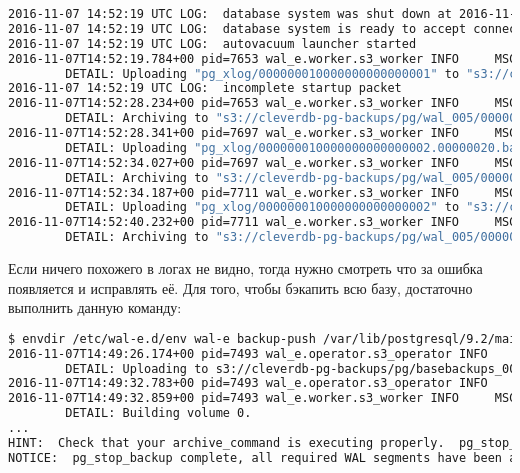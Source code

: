 \begin{lstlisting}[language=Bash,label=lst:wal-e8,caption=Логи PostgreSQL]
2016-11-07 14:52:19 UTC LOG:  database system was shut down at 2016-11-07 14:51:40 UTC
2016-11-07 14:52:19 UTC LOG:  database system is ready to accept connections
2016-11-07 14:52:19 UTC LOG:  autovacuum launcher started
2016-11-07T14:52:19.784+00 pid=7653 wal_e.worker.s3_worker INFO     MSG: begin archiving a file
        DETAIL: Uploading "pg_xlog/000000010000000000000001" to "s3://cleverdb-pg-backups/pg/wal_005/000000010000000000000001.lzo".
2016-11-07 14:52:19 UTC LOG:  incomplete startup packet
2016-11-07T14:52:28.234+00 pid=7653 wal_e.worker.s3_worker INFO     MSG: completed archiving to a file
        DETAIL: Archiving to "s3://cleverdb-pg-backups/pg/wal_005/000000010000000000000001.lzo" complete at 21583.3KiB/s.
2016-11-07T14:52:28.341+00 pid=7697 wal_e.worker.s3_worker INFO     MSG: begin archiving a file
        DETAIL: Uploading "pg_xlog/000000010000000000000002.00000020.backup" to "s3://cleverdb-pg-backups/pg/wal_005/000000010000000000000002.00000020.backup.lzo".
2016-11-07T14:52:34.027+00 pid=7697 wal_e.worker.s3_worker INFO     MSG: completed archiving to a file
        DETAIL: Archiving to "s3://cleverdb-pg-backups/pg/wal_005/000000010000000000000002.00000020.backup.lzo" complete at 00KiB/s.
2016-11-07T14:52:34.187+00 pid=7711 wal_e.worker.s3_worker INFO     MSG: begin archiving a file
        DETAIL: Uploading "pg_xlog/000000010000000000000002" to "s3://cleverdb-pg-backups/pg/wal_005/000000010000000000000002.lzo".
2016-11-07T14:52:40.232+00 pid=7711 wal_e.worker.s3_worker INFO     MSG: completed archiving to a file
        DETAIL: Archiving to "s3://cleverdb-pg-backups/pg/wal_005/000000010000000000000002.lzo" complete at 2466.67KiB/s.
\end{lstlisting}

Если ничего похожего в логах не видно, тогда нужно смотреть что за ошибка появляется и исправлять её. Для того, чтобы бэкапить всю базу, достаточно выполнить данную команду:

\begin{lstlisting}[language=Bash,label=lst:wal-e9,caption=Загрузка бэкапа всей базы данных в S3]
$ envdir /etc/wal-e.d/env wal-e backup-push /var/lib/postgresql/9.2/main
2016-11-07T14:49:26.174+00 pid=7493 wal_e.operator.s3_operator INFO     MSG: start upload postgres version metadata
        DETAIL: Uploading to s3://cleverdb-pg-backups/pg/basebackups_005/base_000000010000000000000006_00000032/extended_version.txt.
2016-11-07T14:49:32.783+00 pid=7493 wal_e.operator.s3_operator INFO     MSG: postgres version metadata upload complete
2016-11-07T14:49:32.859+00 pid=7493 wal_e.worker.s3_worker INFO     MSG: beginning volume compression
        DETAIL: Building volume 0.
...
HINT:  Check that your archive_command is executing properly.  pg_stop_backup can be canceled safely, but the database backup will not be usable without all the WAL segments.
NOTICE:  pg_stop_backup complete, all required WAL segments have been archived
\end{lstlisting}


